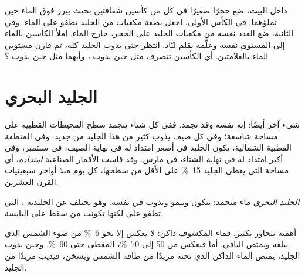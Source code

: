 \begin{inthelab}
داخل البيت، ضع حجرًا صغيرًا في كل من كأسين شفافتين بحيث يبرز فوق الماء حين
تملؤهما. في الكأس الأولى، اجعل بضعة مكعبات من الجليد تطفو على الماء. وفي
الثانية، ضع العدد نفسه من مكعبات الجليد على الحجر، خارج الماء. املأ الكأسين
بالماء إلى المستوى نفسه وعلّمه بقلم لبّاد. انتظر حتى يذوب الجليد كله، ثم قارن
مستويي الماء بالعلامتين. أي الكأسين تتصرف مثل  حين يذوب ،
وأيهما مثل  حين يذوب ؟
\end{inthelab}

\section{الجليد البحري}

 شيء آخر أيضًا: إنه  نفسه وقد تجمد. ففي كل شتاء يتجمد سطح
المحيطات القطبية على مساحة شاسعة؛ وفي كل صيف يذوب كثير من هذا الجليد من جديد.
وفي المنطقة القطبية الشمالية، يكون الجليد في أصغر امتداد له في نهاية الصيف، في
سبتمبر، وفي أكبر امتداد له في نهاية الشتاء، في مارس. وقد قاست الأقمار الصناعية
\emph{امتداده}، أي مساحة  التي يغطي الجليد 15~\% على الأقل من سطحها، كل
يوم منذ أواخر سبعينيات القرن العشرين.

\begin{definition}\label{def:g8:ice-on-earth:sea-ice}
\emph{الجليد البحري} ماء  متجمد: يتكون وينمو ويذوب في
 نفسه. وهو يختلف عن  الجليدية ، التي تطفو على
 لكنها تكونت من  سقط على اليابسة.
\end{definition}

 أهمية تتجاوز  بكثير. فماء  المكشوف داكن: لا يعكس إلا
نحو 6~\% من ضوء الشمس الذي يبلغه ويمتص الباقي. أما  فيعكس من 50
إلى 70~\%،  المغطى  حتى 90~\%. وحين يذوب الجليد، يمتص الماء
الداكن الذي تحته مزيدًا من طاقة الشمس ويسخن، فيذيب مزيدًا من
الجليد.

